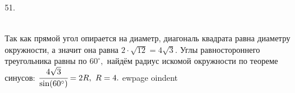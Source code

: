51. \begin{figure}[ht!]
\end{figure}\\
Так как прямой угол опирается на диаметр, диагональ квадрата равна диаметру окружности, а значит она равна $2\cdot\sqrt{12}=4\sqrt{3}.$ Углы равностороннего треугольника равны по $60^\circ,$ найдём радиус искомой окружности по теореме синусов: $\cfrac{4\sqrt{3}}{\sin(60^\circ)}=2R,\ R=4.$
ewpage
oindent
